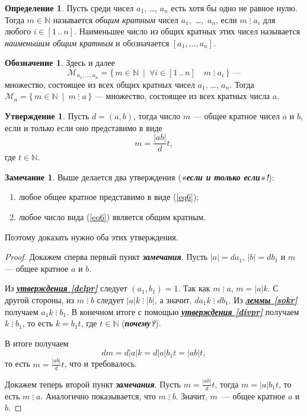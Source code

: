 \documentclass[14pt, a4paper]{extarticle}
\theoremstyle{definition}
\newtheorem*{definition}{Определение}
\newtheorem*{remark}{Замечание}
\newtheorem*{desig}{Обозначение}
\newtheorem{statement}{Утверждение}
\newcommand{\divisible}{\mathop{\vdots}}
\begin{document}
	\begin{definition}
		Пусть среди чисел $a_1$, \dots, $a_n$ есть хотя бы одно не равное нулю. Тогда $m\in\mathbb{N}$ называется \emph{общим кратным} чисел \mbox{$a_1$, \dots, $a_n$}, если $m\divisible a_i$ для любого $i\in[1\,..\,n]$. Наименьшее число из общих кратных этих чисел называется \emph{наименьшим общим кратным} и обозначается $[a_1,\dots,a_n]$.
	\end{definition}
	
	\begin{desig}
		Здесь и далее $$\mathcal{M}_{a_1,\dots,a_n}=\{\,m\in\mathbb{N}\:\mid\:\forall i\in[1\,..\,n]\quad m\divisible a_i\,\}\text{ ---}$$ множество, состоящее из всех общих кратных чисел $a_1$, \dots, $a_n$. Тогда $\mathcal{M}_a=\{\,m\in\mathbb{N}\:\mid\:m\divisible a\,\}$ --- множество, состоящее из всех кратных числа $a$.
	\end{desig}

	\begin{statement}
		Пусть $d=(a,b)$, тогда число $m$ --- общее кратное чисел $a$ и $b$, если и только если оно представимо в виде
		\begin{equation}
		\label{eq6}
			m=\frac{|ab|}{d}t,
		\end{equation}
		где $t\in\mathbb{N}$.
	\end{statement}
	\begin{remark}
		Выше делается два утверждения (\textbf{\textit{«если и только если»!}}):
		\begin{enumerate}[topsep=0pt,itemsep=-1ex,partopsep=1ex,parsep=1ex]
			\item любое общее кратное представимо в виде (\ref{eq6});
			\item любое число вида (\ref{eq6}) является общим кратным.
		\end{enumerate}
		Поэтому доказать нужно оба этих утверждения.
	\end{remark}
	\begin{proof}
		Докажем сперва первый пункт \textbf{\textit{замечания}}. Пусть $|a|=da_1$, $|b|=db_1$ и $m$ --- общее кратное $a$ и $b$.
		
		Из \hyperref[delpr]{\textbf{\textit{утверждения \ref*{delpr}}}} следует $(a_1,b_1)=1$. Так как $m\divisible a$, $m=|a|k$. С другой стороны, из $m\divisible b$ следует $|a|k\divisible|b|$, а значит, $da_1k\divisible db_1$. Из \hyperref[sokr]{\textbf{\textit{леммы \ref*{sokr}}}} получаем $a_1k\divisible b_1$. В конечном итоге с помощью \hyperref[divpr]{\textbf{\textit{утверждения \ref*{divpr}}}} получаем $k\divisible b_1$, то есть $k=b_1t$, где $t\in\mathbb{N}$ (\textbf{\textit{почему?}}).
		
		В итоге получаем $$dm=d|a|k=d|a|b_1t=|ab|t,$$ то есть $m=\frac{|ab|}{d}t$, что и требовалось.
		
		Докажем теперь второй пункт \textbf{\textit{замечания}}. Пусть $m=\frac{|ab|}{d}t$, тогда $m=|a|b_1t$, то есть $m\divisible a$. Аналогично показывается, что $m\divisible b$. Значит, $m$~--- общее кратное $a$ и $b$.
	\end{proof}
	
\end{document}
